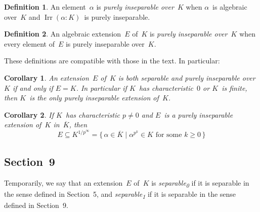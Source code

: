 \documentclass[letterpaper,12pt]{article}
\newcommand{\ac}{\overline}
\DeclareMathOperator{\Irr}{Irr}
\newcommand{\sub}{\textsubscript}
\theoremstyle{definition}
\newtheorem*{defn}{Definition}
\theoremstyle{remark}
\theoremstyle{plain}
\newtheorem*{cor}{Corollary}
\begin{document}
\begin{defn}
An element~\(\alpha\) is \emph{purely inseparable over~\(K\)} when \(\alpha\)~is algebraic over~\(K\) and \(\Irr(\alpha:K)\)~is purely inseparable.
\end{defn}

\begin{defn}
An algebraic extension~\(E\) of~\(K\) is \emph{purely inseparable over~\(K\)} when every element of~\(E\) is purely inseparable over~\(K\).
\end{defn}

\noindent These definitions are compatible with those in the text. In particular:

\begin{cor}
An extension~\(E\) of~\(K\) is both separable and purely inseparable over~\(K\) if and only if \(E=K\). In particular if \(K\)~has characteristic~\(0\) or \(K\)~is finite, then \(K\)~is the only purely inseparable extension of~\(K\).
\end{cor}

\begin{cor}
If \(K\)~has characteristic \(p\ne 0\) and \(E\)~is a purely inseparable extension of~\(K\) in~\(\ac{K}\), then
\[E\subseteq K^{1/p^{\infty}}=\bigl\{\,\alpha\in\ac{K}\mid\alpha^{p^k}\in K\text{ for some }k\ge 0\,\bigr\}\]
\end{cor}

\subsection*{Section~9}
Temporarily, we say that an extension~\(E\) of~\(K\) is \emph{separable\sub{0}} if it is separable in the sense defined in Section~5, and \emph{separable\sub{1}} if it is separable in the sense defined in Section~9.
\end{document}
